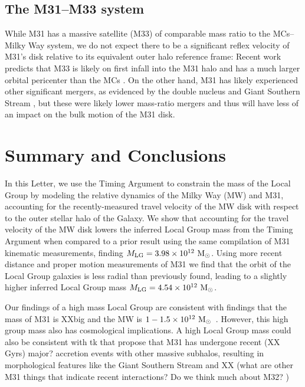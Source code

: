 \documentclass[twocolumn]{aastex631}
\newcommand{\mlg}{\ensuremath{M_{\rm LG}}}
\begin{document}
\subsection{The M31--M33 system}
\label{sec:discussion-m31}
While M31 has a massive satellite (M33) of comparable mass ratio to the
MCs--Milky Way system, we do not expect there to be a significant reflex
velocity of M31's disk relative to its equivalent outer halo reference frame:
Recent work predicts that M33 is likely on first infall into the M31 halo and
has a much larger orbital pericenter than the MCs \citep[e.g.,][]{Patel2017a}.
On the other hand, M31 has likely experienced other significant mergers, as
evidenced by the double nucleus and Giant Southern Stream
\citep[e.g.][]{Ibata:2001, Font:2006}, but these were likely lower mass-ratio
mergers \citep[e.g.][]{Gilbert:2019, Milo:2022} and thus will have less of an
impact on the bulk motion of the M31 disk.

\section{Summary and Conclusions}
\label{sec:summary}
In this Letter, we use the Timing Argument to constrain the mass of the Local
Group by modeling the relative dynamics of the Milky Way (MW) and M31,
accounting for the recently-measured travel velocity of the MW disk with respect
to the outer stellar halo of the Galaxy.
We show that accounting for the travel velocity of the MW disk lowers the
inferred Local Group mass from the Timing Argument when compared to a prior
result using the same compilation of M31 kinematic measurements, finding $\mlg =
3.98\times 10^{12}~\Msun$.
Using more recent distance and proper motion measurements of M31 we find that
the orbit of the Local Group galaxies is less radial than previously found,
leading to a slightly higher inferred Local Group mass $\mlg = 4.54\times10^{12}~\Msun$.



Our findings of a high mass Local Group are consistent with findings that the
mass of M31 is XXbig and the MW is $1-1.5\times10^{12}~\mathrm{M}_\odot$~\citep{??}.
However, this high group mass also has cosmological implications.
A high Local Group mass could also be consistent with tk that propose that M31
has undergone recent (XX Gyrs) major? accretion events with other massive
subhalos, resulting in morphological features like the Giant Southern Stream and
XX (what are other M31 things that indicate recent interactions? Do we think
much about M32? )
\end{document}
